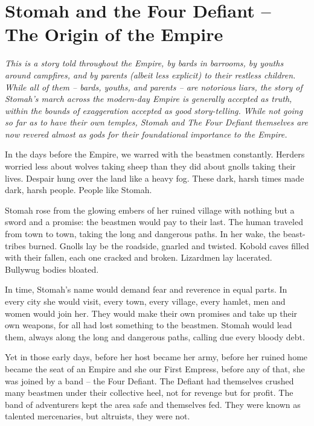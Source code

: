 \section{Stomah and the Four Defiant -- The Origin of the Empire}

\textit{This is a story told throughout the Empire, by bards in barrooms, by youths around
  campfires, and by parents (albeit less explicit) to their restless children.
While all of them -- bards, youths, and parents -- are notorious liars, the story of Stomah's
  march across the modern-day Empire is generally accepted as truth, within the bounds of
  exaggeration accepted as good story-telling.
While not going so far as to have their own temples, Stomah and The Four Defiant themselves are now
  revered almost as gods for their foundational importance to the Empire.}

\medskip

In the days before the Empire, we warred with the beastmen constantly.
Herders worried less about wolves taking sheep than they did about gnolls taking their lives.
Despair hung over the land like a heavy fog.
These dark, harsh times made dark, harsh people.
People like Stomah.

Stomah rose from the glowing embers of her ruined village with nothing but a sword and a promise:
  the beastmen would pay to their last.
The human traveled from town to town, taking the long and dangerous paths.
In her wake, the beast-tribes burned.
Gnolls lay be the roadside, gnarled and twisted.
Kobold caves filled with their fallen, each one cracked and broken.
Lizardmen lay lacerated.
Bullywug bodies bloated.

In time, Stomah's name would demand fear and reverence in equal parts.
In every city she would visit, every town, every village, every hamlet,
  men and women would join her.
They would make their own promises and take up their own weapons, for all had lost something
  to the beastmen.
Stomah would lead them, always along the long and dangerous paths, calling due every bloody debt.

Yet in those early days, before her host became her army, before her ruined home became the seat of
  an Empire and she our First Empress, before any of that, she was joined by a band
  -- the Four Defiant.
The Defiant had themselves crushed many beastmen under their collective heel,
  not for revenge but for profit.
The band of adventurers kept the area safe and themselves fed.
They were known as talented mercenaries, but altruists, they were not.

